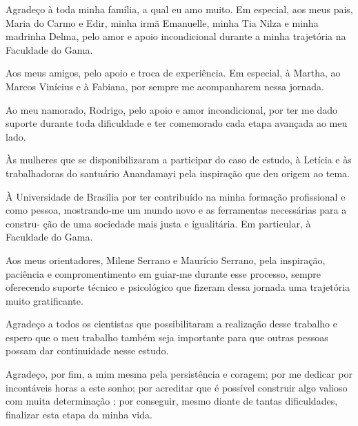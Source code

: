 \begin{agradecimentos}

    Agradeço à toda minha família, a qual eu amo muito. Em especial, aos meus pais,
    Maria do Carmo e Edir, minha irmã Emanuelle, minha Tia Nilza e minha madrinha
    Delma, pelo amor e apoio incondicional durante a minha trajetória na Faculdade do Gama.
    
    Aos meus amigos, pelo apoio e troca de experiência. Em especial, à Martha, ao Marcos
    Vinícius e à Fabiana, por sempre me acompanharem nessa jornada. 
    
    Ao meu namorado, Rodrigo, pelo apoio e amor incondicional, por ter me dado
    suporte durante toda dificuldade e ter comemorado cada etapa avançada ao meu lado.
    
    Às mulheres que se disponibilizaram a participar do caso de estudo, à Letícia e às trabalhadoras do santuário Anandamayi pela inspiração que deu origem ao tema.
    
    À Universidade de Brasília por ter contribuído na minha formação profissional e
    como pessoa, mostrando-me um mundo novo e as ferramentas necessárias para a constru-
    ção de uma sociedade mais justa e igualitária. Em particular, à Faculdade do Gama.
    
    Aos meus orientadores, Milene Serrano e Maurício Serrano, pela inspiração, paciência e compromentimento 
    em guiar-me durante esse processo, sempre oferecendo suporte técnico e psicológico que fizeram 
    dessa jornada uma trajetória muito gratificante. 
    
    Agradeço a todos os cientistas que possibilitaram a realização desse trabalho e espero que 
    o meu trabalho também seja importante para que outras pessoas possam dar continuidade nesse 
    estudo. 
    
    Agradeço, por fim, a mim mesma pela persistência e coragem; por me dedicar por
    incontáveis horas a este sonho; por acreditar que é possível construir algo valioso com muita determinação
    ; por conseguir, mesmo diante de tantas
    dificuldades, finalizar esta etapa da minha vida.
    
    \end{agradecimentos}
    